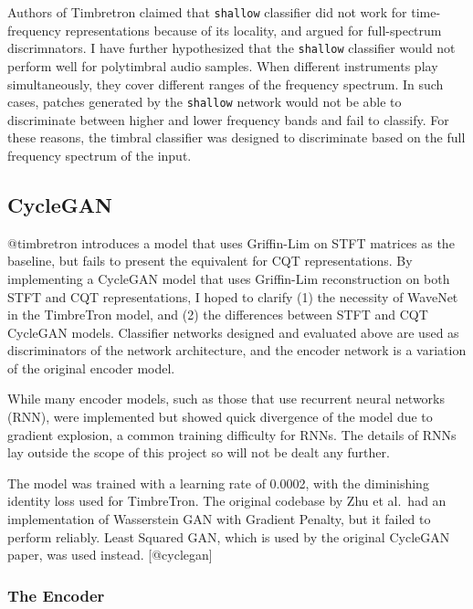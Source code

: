 \documentclass[12pt,a4paper,]{report}
\begin{document}
Authors of Timbretron claimed that \texttt{shallow} classifier did not
work for time-frequency representations because of its locality, and
argued for full-spectrum discrimnators. I have further hypothesized that
the \texttt{shallow} classifier would not perform well for polytimbral
audio samples. When different instruments play simultaneously, they
cover different ranges of the frequency spectrum. In such cases, patches
generated by the \texttt{shallow} network would not be able to
discriminate between higher and lower frequency bands and fail to
classify. For these reasons, the timbral classifier was designed to
discriminate based on the full frequency spectrum of the input.

\hypertarget{cyclegan-1}{%
\subsection{CycleGAN}\label{cyclegan-1}}

@timbretron introduces a model that uses Griffin-Lim on STFT matrices as
the baseline, but fails to present the equivalent for CQT
representations. By implementing a CycleGAN model that uses Griffin-Lim
reconstruction on both STFT and CQT representations, I hoped to clarify
(1) the necessity of WaveNet in the TimbreTron model, and (2) the
differences between STFT and CQT CycleGAN models. Classifier networks
designed and evaluated above are used as discriminators of the network
architecture, and the encoder network is a variation of the original
encoder model.

While many encoder models, such as those that use recurrent neural
networks (RNN), were implemented but showed quick divergence of the
model due to gradient explosion, a common training difficulty for RNNs.
The details of RNNs lay outside the scope of this project so will not be
dealt any further.

The model was trained with a learning rate of 0.0002, with the
diminishing identity loss used for TimbreTron. The original codebase by
Zhu et al.~had an implementation of Wasserstein GAN with Gradient
Penalty, but it failed to perform reliably. Least Squared GAN, which is
used by the original CycleGAN paper, was used instead. {[}@cyclegan{]}

\hypertarget{the-encoder}{%
\subsubsection{The Encoder}\label{the-encoder}}
\end{document}
